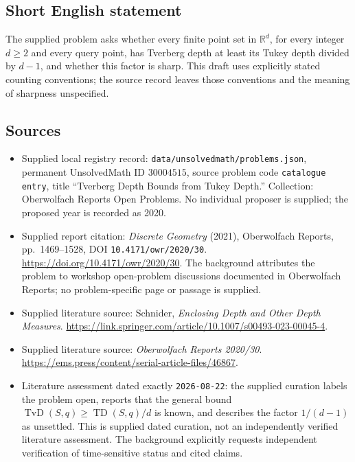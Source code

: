 \documentclass[11pt]{article}
\newcommand{\R}{\mathbb{R}}
\begin{document}
\subsection{Short English statement}
The supplied problem asks whether every finite point set in \(\R^d\), for every integer \(d\geq2\) and every query point, has Tverberg depth at least its Tukey depth divided by \(d-1\), and whether this factor is sharp. This draft uses explicitly stated counting conventions; the source record leaves those conventions and the meaning of sharpness unspecified.
\subsection{Sources}
\begin{itemize}
\item Supplied local registry record: \texttt{data/unsolvedmath/problems.json}, permanent UnsolvedMath ID \(30004515\), source problem code \texttt{catalogue entry}, title ``Tverberg Depth Bounds from Tukey Depth.'' Collection: Oberwolfach Reports Open Problems. No individual proposer is supplied; the proposed year is recorded as 2020.
\item Supplied report citation: \emph{Discrete Geometry} (2021), Oberwolfach Reports, pp.~1469--1528, DOI \texttt{10.4171/owr/2020/30}. \url{https://doi.org/10.4171/owr/2020/30}. The background attributes the problem to workshop open-problem discussions documented in Oberwolfach Reports; no problem-specific page or passage is supplied.
\item Supplied literature source: Schnider, \emph{Enclosing Depth and Other Depth Measures}. \url{https://link.springer.com/article/10.1007/s00493-023-00045-4}.
\item Supplied literature source: \emph{Oberwolfach Reports 2020/30}. \url{https://ems.press/content/serial-article-files/46867}.
\item Literature assessment dated exactly \texttt{2026-08-22}: the supplied curation labels the problem open, reports that the general bound \(\operatorname{TvD}(S,q)\geq\operatorname{TD}(S,q)/d\) is known, and describes the factor \(1/(d-1)\) as unsettled. This is supplied dated curation, not an independently verified literature assessment. The background explicitly requests independent verification of time-sensitive status and cited claims.
\end{itemize}
\end{document}
